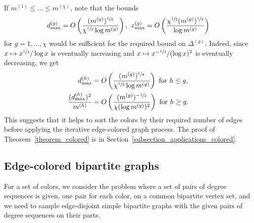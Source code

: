 \documentclass{article}
\theoremstyle{plain}
\theoremstyle{remark}
\theoremstyle{plain}
\numberwithin{equation}{section}
\begin{document}
	If $m^{(1)}\leq\ldots\leq m^{(\chi)}$, note that the bounds $$d_{\max}^{(g)}=O\left(\frac{(m^{(g)})^{\sfrac14}}{\chi^{\sfrac12}\log m^{(g)}}\right),\ x_{\max}^{(g)}=O\left(\frac{\chi^{\sfrac12}(m^{(g)})^{\sfrac14}}{\log m^{(g)}}\right)$$ for $g=1,\ldots,\chi$ would be sufficient for the required bound on $\Delta^{(g)}$. Indeed, since $x\mapsto x^{\sfrac14}/\log x$ is eventually increasing and $x\mapsto x^{-\sfrac12}/(\log x)^2$ is eventually decreasing, we get
	\begin{align}
		d_{\max}^{(h)}&=O\left(\frac{(m^{(g)})^{\sfrac14}}{\chi^{\sfrac12}\log m^{(g)}}\right)\ \text{for}\ h\leq g,
		\\\frac{(d_{\max}^{(h)})^2}{m^{(h)}}&=O\left(\frac{(m^{(g)})^{-\sfrac12}}{\chi(\log m^{(g)})^2}\right)\ \text{for}\ h\geq g.
	\end{align}
	This suggests that it helps to sort the colors by their required number of edges before applying the iterative edge-colored graph process. The proof of Theorem~\ref{theorem_colored} is in Section~\ref{subsection_applications_colored}.
	
	\subsection{Edge-colored bipartite graphs}\label{subsection_results_bipcol}
	
	For a set of colors, we consider the problem where a set of pairs of degree sequences is given, one pair for each color, on a common bipartite vertex set, and we need to sample edge-disjoint simple bipartite graphs with the given pairs of degree sequences on their parts.
	
\end{document}
